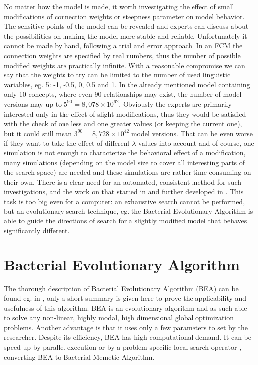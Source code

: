 \documentclass[graybox]{svmult}
\begin{document}
No matter how the model is made, it worth investigating the effect 
of small modifications of connection weights or steepness parameter 
on model behavior. The sensitive points of the model can be revealed 
and experts can discuss about the possibilities on making the model 
more stable and reliable. Unfortunately it cannot be made by hand, 
following a trial and error approach. In an FCM the connection 
weights are specified by real numbers, thus the number of possible 
modified weights are practically infinite. With a reasonable 
compromise we can say that the weights to try can be limited to the 
number of used linguistic variables, eg. 5: -1, -0.5, 0, 0.5 and 1. 
In the already mentioned model containing only 10 concepts, where 
even 90 relationships may exist, the number of model versions may up 
to $5^{90} = 8,078\times10^{62}$. Obviously the experts are primarily 
interested only in the effect of slight modifications, thus they 
would be satisfied with the check of one less and one greater values 
(or keeping the current one), but it could still mean $3^{90} = 
8,728\times10^{42}$ model versions. That can be even worse if they 
want to take the effect of different $\lambda$ values into account and 
of course, one simulation is not enough to characterize the behavioral 
effect of a modification, many simulations (depending on the model 
size to cover all interesting parts of the search space) are needed 
and these simulations are rather time consuming on their own. There is 
a clear need for an automated, consistent method for such 
investigations, and the work on that started in 
\cite{hatwagner2016uncertainty,hatwagner2017behavioral} and further 
developed in \cite{hatwagner2019banking,hatwagner2018improved}. This 
task is too big even for a computer: an exhaustive search cannot be 
performed, but an evolutionary search technique, eg. the Bacterial 
Evolutionary Algorithm is able to guide the directions of search for a 
slightly modified model that behaves significantly different.

\section{Bacterial Evolutionary Algorithm}
\label{sec:bea}

The thorough description of Bacterial Evolutionary Algorithm (BEA) 
can be found eg. in \cite
{nawa1997study,nawa1998study,nawa1998bacterial,nawa1999fuzzy}, only 
a short summary is given here to prove the applicability and 
usefulness of this algorithm. BEA is an evolutionary algorithm and 
as such able to solve any non-linear, highly modal, high dimensional 
global optimization problems. Another advantage is that it uses only 
a few parameters to set by the researcher. Despite its efficiency, 
BEA has high computational demand. It can be speed up by parallel 
execution \cite{hatwagner2011parallel} or by a problem specific 
local search operator \cite{koczy2018enhanced}, converting BEA to 
Bacterial Memetic Algorithm.
\end{document}
